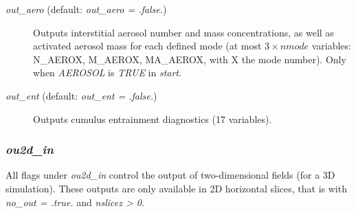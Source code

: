 \documentclass[12pt,A4,french]{article}
\begin{document}
\begin{description}
\item[{\it out\_aero} (default: {\it out\_aero = .false.})]

Outputs interstitial aerosol number and mass concentrations, as well as activated aerosol mass for each defined mode (at most $3\times nmode$ variables: N\_AEROX, M\_AEROX, MA\_AEROX, with X the mode number). Only when {\it AEROSOL} is {\it TRUE} in {\it start}. 

\item[{\it out\_ent} (default: {\it out\_ent = .false.})]

Outputs cumulus entrainment diagnostics (17 variables).

\end{description}

\subsubsection{{\it ou2d\_in}}

All flags under {\it ou2d\_in} control the output of two-dimensional fields (for a 3D simulation). These outputs are only available in 2D horizontal slices, that is with {\it no\_out = .true.} and {\it nslicez > 0}.
\end{document}
